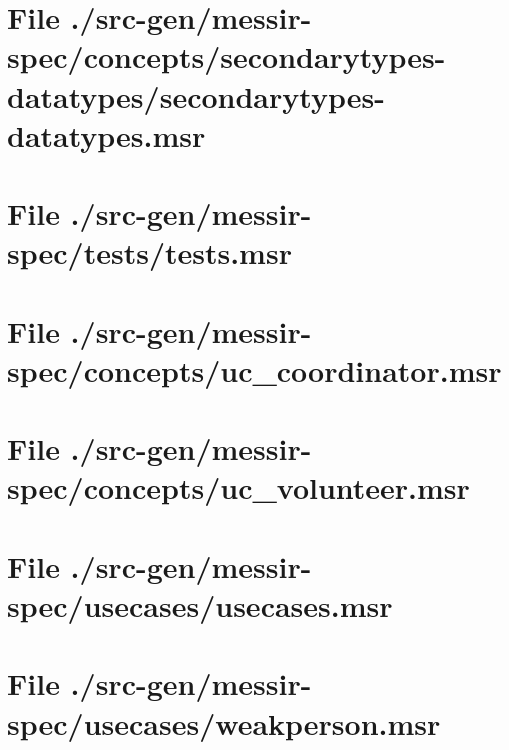 \section[File /src-gen/messir-spec/concepts.../secondarytypes-datatypes.msr]{File ./src-gen/messir-spec/concepts/secondarytypes-datatypes/secondarytypes-datatypes.msr}
\scriptsize

\normalsize
	
\section[File /src-gen/messir-spec/tests/tests.msr]{File ./src-gen/messir-spec/tests/tests.msr}
\scriptsize

\normalsize
	
\section[File /src-gen/messir-spec/concepts/uc_coordinator.msr]{File ./src-gen/messir-spec/concepts/uc_coordinator.msr}
\scriptsize

\normalsize
	
\section[File /src-gen/messir-spec/concepts/uc_volunteer.msr]{File ./src-gen/messir-spec/concepts/uc_volunteer.msr}
\scriptsize

\normalsize
	
\section[File /src-gen/messir-spec/usecases/usecases.msr]{File ./src-gen/messir-spec/usecases/usecases.msr}
\scriptsize

\normalsize
	
\section[File /src-gen/messir-spec/usecases/weakperson.msr]{File ./src-gen/messir-spec/usecases/weakperson.msr}
\scriptsize

\normalsize
	
